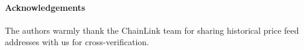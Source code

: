 \documentclass[runningheads]{llncs}
\begin{document}
\paragraph*{Acknowledgements} 
The authors warmly thank the ChainLink team for sharing historical price feed addresses with us for cross-verification.

%
%
% 
% 
%



\end{document}
